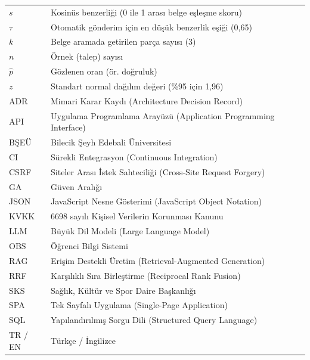 
{\renewcommand{\arraystretch}{1.25}\begin{tabular}{@{}p{2.6cm}p{12cm}@{}}
$s$ & Kosinüs benzerliği (0 ile 1 arası belge eşleşme skoru) \\
$\tau$ & Otomatik gönderim için en düşük benzerlik eşiği (0,65) \\
$k$ & Belge aramada getirilen parça sayısı (3) \\
$n$ & Örnek (talep) sayısı \\
$\hat{p}$ & Gözlenen oran (ör. doğruluk) \\
$z$ & Standart normal dağılım değeri (\%95 için 1,96) \\[6pt]
ADR & Mimari Karar Kaydı (Architecture Decision Record) \\
API & Uygulama Programlama Arayüzü (Application Programming Interface) \\
BŞEÜ & Bilecik Şeyh Edebali Üniversitesi \\
CI & Sürekli Entegrasyon (Continuous Integration) \\
CSRF & Siteler Arası İstek Sahteciliği (Cross-Site Request Forgery) \\
GA & Güven Aralığı \\
JSON & JavaScript Nesne Gösterimi (JavaScript Object Notation) \\
KVKK & 6698 sayılı Kişisel Verilerin Korunması Kanunu \\
LLM & Büyük Dil Modeli (Large Language Model) \\
OBS & Öğrenci Bilgi Sistemi \\
RAG & Erişim Destekli Üretim (Retrieval-Augmented Generation) \\
RRF & Karşılıklı Sıra Birleştirme (Reciprocal Rank Fusion) \\
SKS & Sağlık, Kültür ve Spor Daire Başkanlığı \\
SPA & Tek Sayfalı Uygulama (Single-Page Application) \\
SQL & Yapılandırılmış Sorgu Dili (Structured Query Language) \\
TR / EN & Türkçe / İngilizce \\
\end{tabular}}
